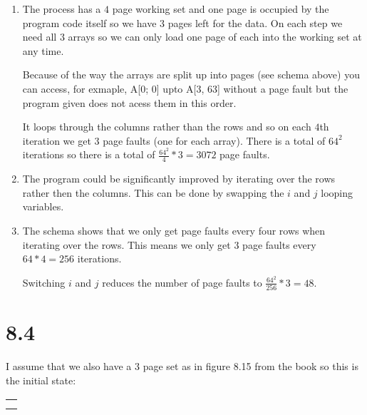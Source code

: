 \documentclass[12pt]{article}
\begin{document}
\begin{enumerate}[a]
	\item %
	The process has a $4$ page working set and one page is occupied by the program code itself so we have $3$ pages left for the data. On each step we need all $3$ arrays so we can only load one page of each into the working set at any time.

	Because of the way the arrays are split up into pages (see schema above) you can access, for exmaple, A[0; 0] upto A[3, 63] without a page fault but the program given does not acess them in this order.

	It loops through the columns rather than the rows and so on each $4$th iteration we get $3$ page faults (one for each array). There is a total of $64^2$ iterations so there is a total of $\frac{64^2}{4} * 3 = 3072$ page faults.

	\item %
	The program could be significantly improved by iterating over the rows rather then the columns. This can be done by swapping the $i$ and $j$ looping variables.

	\item %
	The schema shows that we only get page faults every four rows when iterating over the rows. This means we only get $3$ page faults every $64 * 4 = 256$ iterations.

	Switching $i$ and $j$ reduces the number of page faults to $\frac{64^2}{256} * 3 = 48$.
\end{enumerate}

\section*{8.4}
I assume that we also have a $3$ page set as in figure 8.15 from the book so this is the initial state:

\begin{tabular}{|p{2em}|}
	\hline
	\\
	\hline
	\\
	\hline
	\\
	\hline
\end{tabular}
\end{document}
